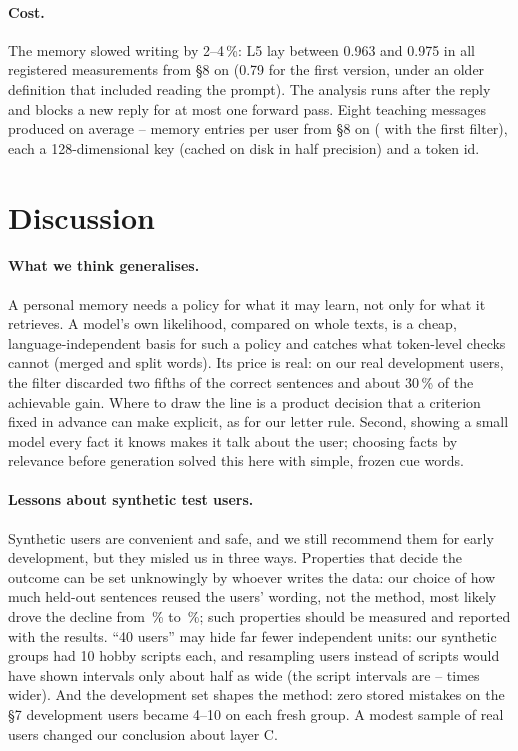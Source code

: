 \documentclass[10pt,twocolumn]{article}
\newcommand{\pct}{\,\%}
\begin{document}
\paragraph{Cost.} The memory slowed writing by 2--4\pct: L5 lay between 0.963 and 0.975 in all registered measurements
from \S8 on (0.79 for the first version, under an older definition that included reading the prompt). The analysis runs
after the reply and blocks a new reply for at most one forward pass. Eight teaching messages produced on average
-- memory entries per user from \S8 on ( with the first filter),
each a 128-dimensional key (cached on disk in half precision) and a token id.

\section{Discussion}\label{sec:discussion}

\paragraph{What we think generalises.} A personal memory needs a policy for what it may learn, not only for what it
retrieves. A model's own likelihood, compared on whole texts, is a cheap, language-independent basis for such a policy
and catches what token-level checks cannot (merged and split words). Its price is real: on our real development users,
the filter discarded two fifths of the correct sentences and about 30\pct{} of the achievable gain. Where to draw the line
is a product decision that a criterion fixed in advance can make explicit, as for our letter rule. Second, showing a
small model every fact it knows makes it talk about the user; choosing facts by relevance before generation solved this
here with simple, frozen cue words.

\paragraph{Lessons about synthetic test users.} Synthetic users are convenient and safe, and we still recommend them for
early development, but they misled us in three ways. Properties that decide the outcome can be set unknowingly by
whoever writes the data: our choice of how much held-out sentences reused the users' wording, not the method, most
likely drove the decline from \pct{} to \pct; such properties should be measured and reported with the results.
``40 users'' may hide far fewer independent units: our synthetic groups had 10 hobby scripts each, and resampling users
instead of scripts would have shown intervals only about half as wide (the script intervals are
-- times wider). And the development set shapes the method: zero stored mistakes on
the \S7 development users became 4--10 on each fresh group. A modest sample of real users changed our
conclusion about layer C.
\end{document}
